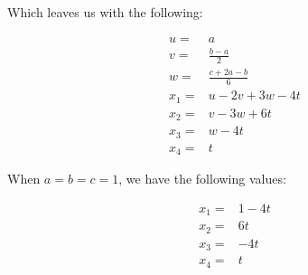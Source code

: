 \documentclass[11pt]{article}
\begin{document}
Which leaves us with the following:

\begin{align*}
 u =& a \\
 v =& \frac{b-a}{2} \\
 w =& \frac{c+2a-b}{6} \\
 x_1 =& u -2v +3w -4t \\
 x_2 =& v -3w + 6t \\
 x_3 =& w -4t \\
 x_4 =& t
\end{align*}

When \(a=b=c=1\), we have the following values:

\begin{align*}
 x_1 =& 1 -4t \\
 x_2 =& 6t \\
 x_3 =& -4t \\
 x_4 =& t
\end{align*}
\end{document}
